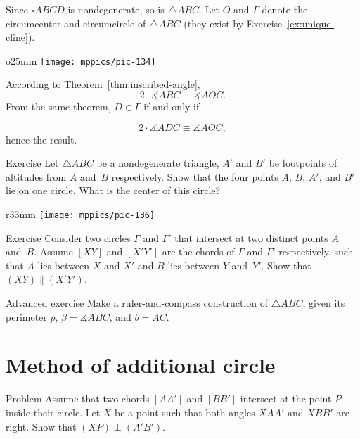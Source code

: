 Since $\square ABCD$ is nondegenerate, so is $\triangle ABC$.
Let $O$ and $\Gamma$ denote the circumcenter and circumcircle of $\triangle ABC$ (they exist by Exercise~\ref{ex:unique-cline}).

{

\begin{wrapfigure}[10]{o}{25mm}
\vskip-0mm
\centering
\texttt{[image: mppics/pic-134]}
\end{wrapfigure}

According to Theorem~\ref{thm:inscribed-angle},
$$
2\cdot\measuredangle ABC
\equiv
\measuredangle AOC.
$$
From the same theorem, $D\in\Gamma$ if and only if 

$$
2\cdot\measuredangle ADC
\equiv\measuredangle AOC,
$$
hence the result.
\qeds

}


{

\begin{thm}{Exercise}\label{ex:VVAA}
Let $\triangle A B C$ be a nondegenerate triangle,
$A'$ and $B'$ be footpoints of altitudes from $A$ and~$B$ respectively.
Show that the four points $A$, $B$, $A'$, and $B'$ lie on one circle.
What is the center of this circle?
\end{thm}

\begin{wrapfigure}{r}{33mm}
\vskip-6mm
\centering
\texttt{[image: mppics/pic-136]}
\end{wrapfigure}

\begin{thm}{Exercise}\label{ex:secant-circles}
Consider two circles $\Gamma$ and $\Gamma'$ that intersect at two distinct points $A$ and~$B$.
Assume $[XY]$ and $[X'Y']$ are the chords of $\Gamma$ and $\Gamma'$ respectively,
such that $A$ lies between $X$ and $X'$ and $B$ lies between $Y$ and~$Y'$.
Show that $(XY)\parallel (X'Y')$.
\end{thm}

}

\begin{thm}{Advanced exercise}\label{ex:perim+angle+side}
Make a ruler-and-compass construction of $\triangle ABC$, given its perimeter $p$, $\beta=\measuredangle ABC$, and $b=AC$.
\end{thm}

\section{Method of additional circle}

\begin{thm*}{Problem}
 Assume that two chords $[AA']$ and $[BB']$ intersect at the point $P$ inside their circle.
Let $X$ be a point such that both angles $XAA'$ and $XBB'$ are right.
Show that $(XP)\perp(A'B')$.
\end{thm*}

